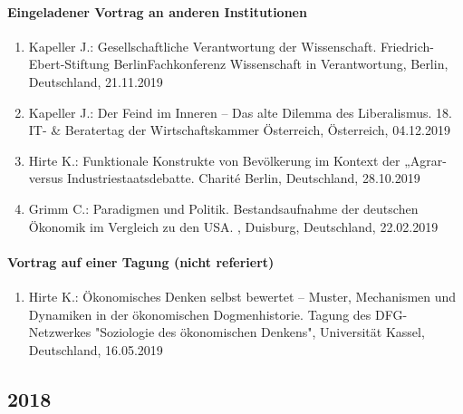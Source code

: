 \paragraph{Eingeladener Vortrag an anderen Institutionen}
\begin{enumerate}
	\item Kapeller J.: Gesellschaftliche Verantwortung der Wissenschaft. Friedrich-Ebert-Stiftung BerlinFachkonferenz Wissenschaft in Verantwortung, Berlin, Deutschland, 21.11.2019
	\item Kapeller J.: Der Feind im Inneren – Das alte Dilemma des Liberalismus. 18. IT- & Beratertag der Wirtschaftskammer Österreich, Österreich, 04.12.2019
	\item Hirte K.: Funktionale Konstrukte von Bevölkerung im Kontext der „Agrar- versus Industriestaatsdebatte. Charité Berlin, Deutschland, 28.10.2019
	\item Grimm C.: Paradigmen und Politik. Bestandsaufnahme der deutschen Ökonomik im Vergleich zu den USA. , Duisburg, Deutschland, 22.02.2019
\end{enumerate}
\paragraph{Vortrag auf einer Tagung (nicht referiert)}
\begin{enumerate}
	\item Hirte K.: Ökonomisches Denken selbst bewertet – Muster, Mechanismen und Dynamiken in der ökonomischen Dogmenhistorie. Tagung des DFG-Netzwerkes "Soziologie des ökonomischen Denkens", Universität Kassel, Deutschland, 16.05.2019
\end{enumerate}
\subsection*{2018}
